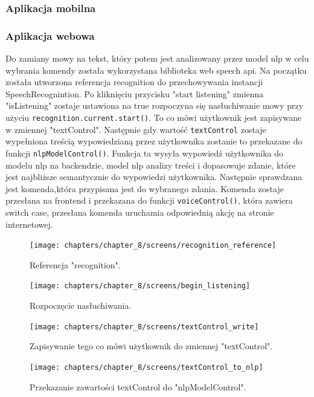 \subsubsection{Aplikacja mobilna}

\subsubsection{Aplikacja webowa}
Do zamiany mowy na tekst, który potem jest analizowany przez model nlp w celu wybrania komendy została wykorzystana biblioteka web speech api. Na początku została utworzona referencja recognition do przechowywania instancji SpeechRecognintion. Po kliknięciu przycisku "start listening" zmienna "isListening" zostaje ustawiona na true rozpoczyna się nasłuchiwanie mowy przy użyciu \texttt{recognition.current.start()}. To co mówi użytkownik jest zapisywane w zmiennej "textControl". Następnie gdy wartość \texttt{textControl} zostaje wypełniona treścią wypowiedzianą przez użytkownika zostanie to przekazane do funkcji \texttt{nlpModelControl()}. Funkcja ta wysyła wypowiedź użytkownika do modelu nlp na backendzie, model nlp analizy treści i dopasowuje  zdanie, które jest najbliższe semantycznie do wypowiedzi użytkownika. Następnie sprawdzana jest komenda,która przypisana jest do wybranego zdania. Komenda zostaje przesłana na frontend i przekazana do funkcji \texttt{voiceControl()}, która zawiera switch case, przesłana komenda uruchamia odpowiednią akcję na stronie internetowej.


\begin{figure}[H]
    \centering
    \texttt{[image: chapters/chapter\_8/screens/recognition\_reference]}
    \caption{Referencja "recognition".}
    \label{img:recognition_reference}
\end{figure}


\begin{figure}[H]
    \centering
    \texttt{[image: chapters/chapter\_8/screens/begin\_listening]}
    \caption{Rozpoczęcie nasłuchiwania.}
    \label{img:begin_listening}
\end{figure}

\begin{figure}[H]
    \centering
    \texttt{[image: chapters/chapter\_8/screens/textControl\_write]}
    \caption{Zapisywanie tego co mówi użytkownik do zmiennej "textControl".}
    \label{img:textControl_write}
\end{figure}



\begin{figure}[H]
    \centering
    \texttt{[image: chapters/chapter\_8/screens/textControl\_to\_nlp]}
    \caption{Przekazanie zawartości textControl do "nlpModelControl".}
    \label{img:textControl_to_nlp}
\end{figure}

